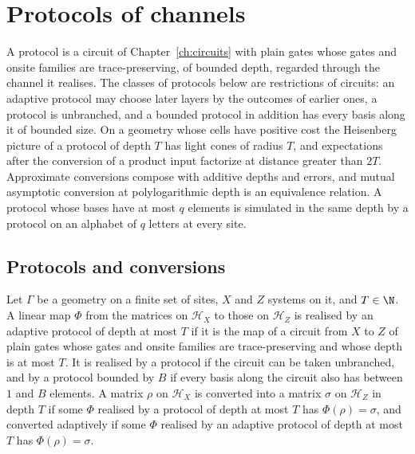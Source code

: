 \chapter{Protocols of channels}
\label{ch:protocols}

A protocol is a circuit of Chapter~\ref{ch:circuits} with plain gates whose gates and onsite
families are trace-preserving, of bounded depth, regarded through the channel it realises.
The classes of protocols below are restrictions of circuits: an adaptive protocol may choose
later layers by the outcomes of earlier ones, a protocol is unbranched, and a bounded protocol
in addition has every basis along it of bounded size. On a geometry whose cells have positive
cost the Heisenberg picture of a protocol of depth $T$ has light cones of radius $T$, and
expectations after the conversion of a product input factorize at distance greater than $2T$.
Approximate conversions compose with additive depths and errors, and mutual asymptotic
conversion at polylogarithmic depth is an equivalence relation.
A protocol whose bases have at most $q$ elements is simulated in the same depth by a protocol on
an alphabet of $q$ letters at every site.

\section{Protocols and conversions}
\label{sec:protocols_classes}

\begin{definition}[Protocols]
    \label{def:protocols_protocol}
    \leanok
    Let $\Gamma$ be a geometry on a finite set of sites, $X$ and $Z$ systems on it, and
    $T\in\N$. A linear map $\Phi$ from the matrices on $\mathcal H_X$ to those on $\mathcal H_Z$
    is realised by an adaptive protocol of depth at most $T$ if it is the map of a circuit
    from $X$ to $Z$ of plain gates whose gates and onsite families are trace-preserving and
    whose depth is at most $T$. It is realised by a protocol if the circuit can be taken
    unbranched, and by a protocol bounded by $B$ if every basis along the circuit also has
    between $1$ and $B$ elements. A matrix $\rho$ on $\mathcal H_X$ is converted into a matrix
    $\sigma$ on $\mathcal H_Z$ in depth $T$ if some $\Phi$ realised by a protocol of depth at
    most $T$ has $\Phi(\rho)=\sigma$, and converted adaptively if some $\Phi$ realised by an
    adaptive protocol of depth at most $T$ has $\Phi(\rho)=\sigma$.
\end{definition}

